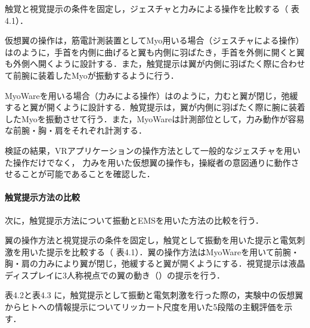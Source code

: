 \begin{small}
      触覚と視覚提示の条件を固定し，ジェスチャと力みによる操作を比較する（
      表4.1）．

      仮想翼の操作は，筋電計測装置としてMyo用いる場合（ジェスチャによる操作）はのように，手首を内側に曲げると翼も内側に羽ばたき，手首を外側に開くと翼も外側へ開くように設計する．また，触覚提示は翼が内側に羽ばたく際に合わせて前腕に装着したMyoが振動するように行う．
      
      MyoWareを用いる場合（力みによる操作）はのように，力むと翼が閉じ，弛緩すると翼が開くように設計する．触覚提示は，翼が内側に羽ばたく際に腕に装着したMyoを振動させて行う．また，MyoWareは計測部位として，力み動作が容易な前腕・胸・肩をそれぞれ計測する．

      検証の結果，VRアプリケーションの操作方法として一般的なジェスチャを用いた操作だけでなく，
      力みを用いた仮想翼の操作も，操縦者の意図通りに動作させることが可能であることを確認した．

    \paragraph{触覚提示方法の比較} %
      次に，触覚提示方法について振動とEMSを用いた方法の比較を行う．
    
      翼の操作方法と視覚提示の条件を固定し，触覚として振動を用いた提示と電気刺激を用いた提示を比較する（
      表4.1）．翼の操作方法はMyoWareを用いて前腕・胸・肩の力みにより翼が閉じ，弛緩すると翼が開くようにする．視覚提示は液晶ディスプレイに3人称視点での翼の動き（）の提示を行う．

      表4.2と表4.3
      に，触覚提示として振動と電気刺激を行った際の，実験中の仮想翼からヒトへの情報提示についてリッカート尺度を用いた5段階の主観評価を示す．
      

\end{small}
